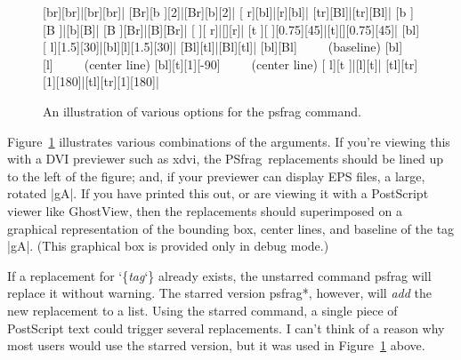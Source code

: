 \documentclass[11pt]{ltxguide}
\let\pkg\textsf
\newcommand{\pfg}{\pkg{PSfrag}}
\def\cs#1{%
  {\ttfamily\expandafter\string\csname #1\endcsname}}
\providecommand\marg[1]{%
  {\ttfamily\char`\{}{\em#1\/}{\ttfamily\char`\}}}
\begin{document}
\begin{figure}[tbh]
\psfragdebugon
\begin{center}
     [br][br]{|[br][br]|}
     [Br][b ][2]{|[Br][b][2]|}
     [ r][bl]{|[r][bl]|}
     [tr][Bl]{|[tr][Bl]|}
     [b ][B ]{|[b][B]|}
     [B ][Br]{|[B][Br]|}
     [  ][ r]{|[][r]|}
     [t ][  ][0.75][45]{|[t][][0.75][45]|}
     [bl][ l][1.5][30]{|[bl][l][1.5][30]|}
     [Bl][tl]{|[Bl][tl]|}
     [bl][Bl]{~~~~~(baseline)}
     [bl][l]{~~~~~(center line)}
     [bl][t][1][-90]{~~~~~(center line)}
     [ l][t ]{|[l][t]|}
     [tl][tr][1][180]{|[tl][tr][1][180]|}
\end{center}
\caption{An illustration of various options for the \cs{psfrag} command.}
\label{fig:argexam}
\end{figure}
Figure~\ref{fig:argexam} illustrates various combinations of the arguments. If
you're viewing this with a DVI previewer such as \pkg{xdvi}, the \pfg\
replacements should be lined up to the left of the figure; and, if your
previewer can display EPS files, a large, rotated |gA|. If you have printed
this out, or are viewing it with a PostScript viewer like GhostView, then the
replacements should superimposed on a graphical representation of the bounding
box, center lines, and baseline of the tag |gA|. (This graphical box is
provided only in debug mode.)

If a replacement for \marg{tag} already exists, the unstarred
command \cs{psfrag} will replace it without warning. The starred
version \cs{psfrag*}, however, will \emph{add} the new replacement
to a list. Using the starred command, a single piece of PostScript
text could trigger several replacements. I can't think of a reason
why most users would use the starred version, but it was used in
Figure~\ref{fig:argexam} above.
\end{document}
